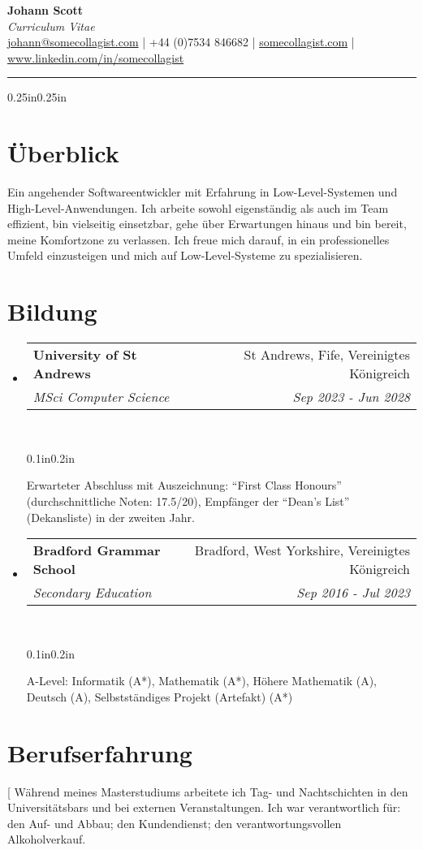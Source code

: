 \documentclass[a4paper]{article}
\makeatletter
\newcommand{\emailaddr}{johann@somecollagist.com}
\newcommand{\phonenumber}{+44 (0)7534 846682}
\newcommand{\website}{somecollagist.com}
\newcommand{\linkedin}{www.linkedin.com/in/somecollagist}
\newcommand{\resumeSubheading}[5][]{
  \vspace{2pt}\item
    \begin{tabular*}{0.875\textwidth}[t]{l@{\extracolsep{\fill}}r}
      \textbf{#2} & #3 \\
      \textit{\small#4} & \textit{\small #5} \\
    \end{tabular*}\\
    \vspace{-5pt}
    \begin{adjustwidth}{0.1in}{0.2in}
      #1
    \end{adjustwidth}
    \vspace{10pt}
}
\newcommand{\resumeSubheadingList}[1]{
  \begin{itemize}
    #1
  \end{itemize}
}
\makeatother
\begin{document}
\begin{center}
  \huge \textbf{Johann Scott} \\
  \normalsize \textit{Curriculum Vitae} \\
  \vspace{1em}
  {
    \href{mailto:\emailaddr}{\emailaddr} {|}
    {\phonenumber} {|}
    \href{https://\website}{\website} {|}
    \href{https://\linkedin}{\linkedin}
  } \\
  \vspace{1em}
  \rule{\linewidth}{1pt}
\end{center}

\begin{adjustwidth}{0.25in}{0.25in}

  \section{Überblick}
  Ein angehender Softwareentwickler mit Erfahrung in Low-Level-Systemen und
  High-Level-Anwendungen. Ich arbeite sowohl eigenständig als auch im Team
  effizient, bin vielseitig einsetzbar, gehe über Erwartungen hinaus und bin
  bereit, meine Komfortzone zu verlassen. Ich freue mich darauf, in ein
  professionelles Umfeld einzusteigen und mich auf Low-Level-Systeme zu
  spezialisieren.

  \section{Bildung}
    \resumeSubheadingList{
      \resumeSubheading[
        Erwarteter Abschluss mit Auszeichnung: ``First Class Honours'' (durchschnittliche Noten: 17.5/20), Empfänger
        der ``Dean's List'' (Dekansliste) in der zweiten Jahr.
      ]
        {University of St Andrews}
        {St Andrews, Fife, Vereinigtes Königreich}
        {MSci Computer Science}
        {Sep 2023 {-} Jun 2028}
      \resumeSubheading[
        A-Level: Informatik (A*), Mathematik (A*), Höhere
        Mathematik (A), Deutsch (A), Selbstständiges Projekt (Artefakt) (A*)
      ]
        {Bradford Grammar School}
        {Bradford, West Yorkshire, Vereinigtes Königreich}
        {Secondary Education}
        {Sep 2016 {-} Jul 2023}
    }

  \section{Berufserfahrung}
    \resumeSubheadingList{
      \resumeSubheading[
        Während meines Masterstudiums arbeitete ich Tag- und Nachtschichten in
        den Universitätsbars und bei externen Veranstaltungen. Ich war
        verantwortlich für: den Auf- und Abbau; den Kundendienst; den
        verantwortungsvollen Alkoholverkauf.

}
\end{adjustwidth}
\end{document}
